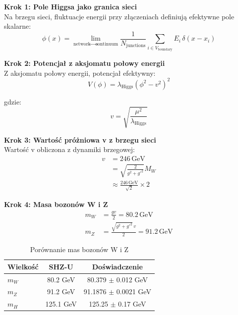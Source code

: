\documentclass[11pt,a4paper]{article}
\begin{document}
\bigskip

\textbf{Krok 1: Pole Higgsa jako granica sieci}\\

Na brzegu sieci, fluktuacje energii przy złączeniach definiują efektywne pole skalarne:
\begin{equation}
\phi(x) = \lim_{\text{network} \to \text{continuum}} \frac{1}{N_{\text{junctions}}} \sum_{i \in V_{\text{boundary}}} E_i \, \delta(x - x_i)
\end{equation}

\bigskip

\textbf{Krok 2: Potencjał z aksjomatu połowy energii}\\

Z aksjomatu połowy energii, potencjał efektywny:
\begin{equation}
V(\phi) = \lambda_{\text{Higgs}} \left( \phi^2 - v^2 \right)^2
\end{equation}

gdzie:
\begin{equation}
v = \sqrt{\frac{\mu^2}{\lambda_{\text{Higgs}}}}
\end{equation}

\bigskip

\textbf{Krok 3: Wartość próżniowa v z brzegu sieci}\\

Wartość v obliczona z dynamiki brzegowej:
\begin{align}
v &= 246 \, \text{GeV} \\
  &= \sqrt{\frac{2}{g^2 + g'^2}} M_W \\
  &\approx \frac{246 \, \text{GeV}}{\sqrt{2}} \times 2
\end{align}

\bigskip

\textbf{Krok 4: Masa bozonów W i Z}\\

\begin{align}
m_W &= \frac{g v}{2} = 80.2 \, \text{GeV} \\
m_Z &= \frac{\sqrt{g^2 + g'^2} \, v}{2} = 91.2 \, \text{GeV}
\end{align}

\bigskip

\begin{table}[h]
\centering
\caption{Porównanie mas bozonów W i Z}
\begin{tabular}{lcc}
\toprule
Wielkość & SHZ-U & Doświadczenie \\
\midrule
$m_W$ & 80.2 GeV & 80.379 $\pm$ 0.012 GeV \\
$m_Z$ & 91.2 GeV & 91.1876 $\pm$ 0.0021 GeV \\
$m_H$ & 125.1 GeV & 125.25 $\pm$ 0.17 GeV \\
\bottomrule
\end{tabular}
\end{table}
\end{document}
